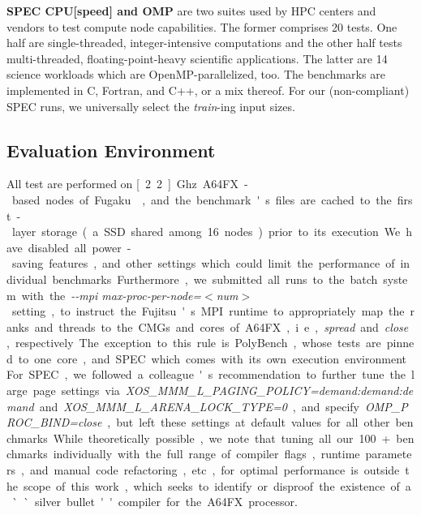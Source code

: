 \documentclass[conference,compsoc]{IEEEtran}
\begin{document}
\textbf{SPEC CPU[speed] and OMP} are two suites used by HPC centers and vendors to test
compute node capabilities. The former comprises 20 tests. One half are single-threaded,
integer-intensive computations and the other half tests multi-threaded, floating-point-heavy scientific
applications. The latter are 14 science workloads which are OpenMP-parallelized, too. The benchmarks
are implemented in C, Fortran, and C++, or a mix thereof. For our (non-compliant) SPEC runs, we universally
select the \textit{train}-ing input sizes.

\subsection{Evaluation Environment}\label{sec:metho:env}
All test are performed on \unit[2.2]{Ghz} A64FX-based nodes of Fugaku~\cite{fujitsu_limited_fujitsu_nodate,sato_co-design_2020}, and the benchmark's files
are cached to the first-layer storage (a SSD shared among 16 nodes) prior to its execution. We have disabled all power-saving features,
and other settings which could limit the performance of individual benchmarks. Furthermore, we submitted
all runs to the batch system with the \textit{-{}-mpi max-proc-per-node=$<$num$>$} setting, to instruct the
Fujitsu's MPI runtime to appropriately map the ranks and threads to the CMGs and cores of A64FX, i.e., \textit{spread} and \textit{close}, respectively.
The exception to this rule is PolyBench, whose tests are pinned to one core, and SPEC which comes with
its own execution environment. For SPEC, we followed a colleague's recommendation to further tune
the large page settings via \textit{XOS\_MMM\_L\_PAGING\_POLICY=demand:demand:demand} and \textit{XOS\_MMM\_L\_ARENA\_LOCK\_TYPE=0},
and specify \textit{OMP\_PROC\_BIND=close}, but left these settings at default values for all other benchmarks.

While theoretically possible, we note that tuning all our 100+ benchmarks individually with the full range of compiler flags,
runtime parameters, and manual code refactoring, etc., for optimal performance is outside the scope of this work,
which seeks to identify or disproof the existence of a ``silver bullet'' compiler for the A64FX processor.
\end{document}
